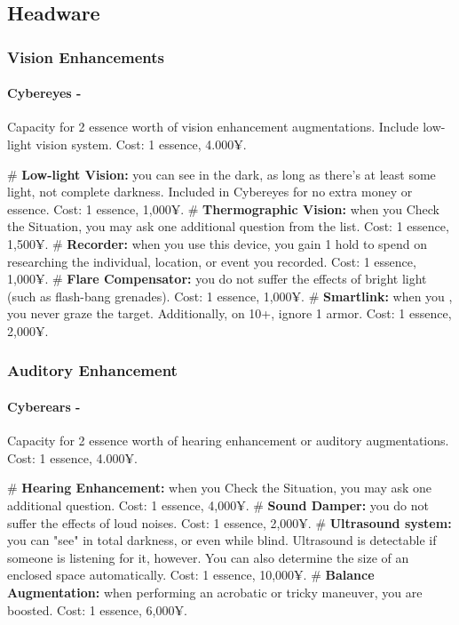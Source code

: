 \subsection{Headware}

\subsubsection{Vision Enhancements}
\paragraph{Cybereyes -} Capacity for 2 essence worth of vision enhancement augmentations. Include low-light vision system. Cost: 1 essence, 4.000¥.

\begin{easylist}
    # \textbf{Low-light Vision:} you can see in the dark, as long as there’s at least some light, not complete darkness. Included in Cybereyes for no extra money or essence. Cost: 1 essence, 1,000¥.    
    # \textbf{Thermographic Vision:} when you Check the Situation, you may ask one additional question from the list. Cost: 1 essence, 1,500¥.    
    # \textbf{Recorder:} when you use this device, you gain 1 hold to spend on researching the individual, location, or event you recorded. Cost: 1 essence, 1,000¥.    
    # \textbf{Flare Compensator:} you do not suffer the effects of bright light (such as flash-bang grenades). Cost: 1 essence, 1,000¥.    
    # \textbf{Smartlink:} when you , you never graze the target. Additionally, on 10+, ignore 1 armor. Cost: 1 essence, 2,000¥.
\end{easylist}
    

\subsubsection{Auditory Enhancement}
\paragraph{Cyberears -} Capacity for 2 essence worth of hearing enhancement or auditory augmentations. Cost: 1 essence, 4.000¥.

\begin{easylist}
    # \textbf{Hearing Enhancement:} when you Check the Situation, you may ask one additional question. Cost: 1 essence, 4,000¥.
    # \textbf{Sound Damper:} you do not suffer the effects of loud noises. Cost: 1 essence, 2,000¥.
    # \textbf{Ultrasound system:} you can "see" in total darkness, or even while blind. Ultrasound is detectable if someone is listening for it, however. You can also determine the size of an enclosed space automatically. Cost: 1 essence, 10,000¥.    
    # \textbf{Balance Augmentation:} when performing an acrobatic or tricky maneuver, you are boosted. Cost: 1 essence, 6,000¥.
\end{easylist}


